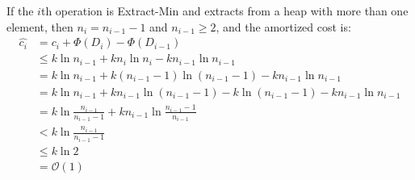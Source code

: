 \documentclass[12pt,letterpaper]{article}
\begin{document}
If the $i$th operation is Extract-Min and extracts from a heap with more than one element, then $n_i = n_{i-1} - 1$ and $n_{i-1} \ge 2$, and the amortized cost is:
\begin{align*}
\widehat{c_i} &= c_i + \Phi(D_i) - \Phi(D_{i-1}) \\
&\le k \ln n_{i-1} + k n_i \ln n_i - k n_{i-1} \ln n_{i-1} \\ 
&= k \ln n_{i-1} + k (n_{i-1} -1) \ln (n_{i-1} - 1) - k n_{i-1} \ln n_{i-1} \\
&= k \ln n_{i-1} + k n_{i-1} \ln (n_{i-1} - 1) - k \ln (n_{i-1}-1) - k n_{i-1} \ln n_{i-1} \\
&= k \ln \frac{n_{i-1}}{n_{i-1} - 1} + k n_{i-1} \ln \frac{n_{i-1} - 1}{n_{i-1}} \\
&< k \ln \frac{n_{i-1}}{n_{i-1} - 1} \\
&\le k \ln 2 \\
&= \mathcal{O}(1)
\end{align*}
\end{document}
